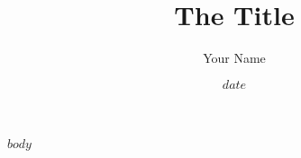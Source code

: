\documentclass[10pt]{article}
\title{The Title}
\author{Your Name}
\date{$date$}
\begin{document}
\maketitle
\newpage

\tableofcontents

$body$
\end{document}
